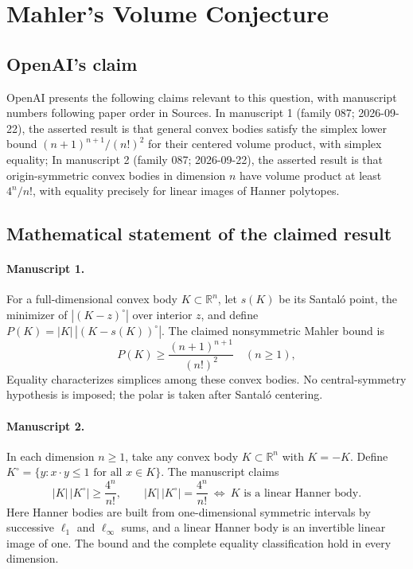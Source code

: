 \documentclass[11pt]{article}
\begin{document}
\section*{Mahler’s Volume Conjecture}

\subsection{OpenAI's claim}
OpenAI presents the following claims relevant to this question, with manuscript numbers following paper order in Sources. In manuscript 1 (family 087; 2026-09-22), the asserted result is that general convex bodies satisfy the simplex lower bound $(n+1)^{n+1}/(n!)^2$ for their centered volume product, with simplex equality; In manuscript 2 (family 087; 2026-09-22), the asserted result is that origin-symmetric convex bodies in dimension $n$ have volume product at least $4^n/n!$, with equality precisely for linear images of Hanner polytopes.

\subsection{Mathematical statement of the claimed result}
\paragraph{Manuscript 1.}
For a full-dimensional convex body $K\subset\mathbb R^n$, let $s(K)$ be its Santal\'o point, the minimizer of $|(K-z)^{\circ}|$ over interior $z$, and define $P(K)=|K|\,|(K-s(K))^{\circ}|$. The claimed nonsymmetric Mahler bound is
\[
 P(K)\ge\frac{(n+1)^{n+1}}{(n!)^2}\quad(n\ge1),
\]
Equality characterizes simplices among these convex bodies. No central-symmetry hypothesis is imposed; the polar is taken after Santal\'o centering.

\paragraph{Manuscript 2.}
In each dimension $n\ge1$, take any convex body $K\subset\mathbb R^n$ with $K=-K$. Define $K^{\circ}=\{y:x\cdot y\le1\text{ for all }x\in K\}$. The manuscript claims
\[
 |K|\,|K^{\circ}|\ge\frac{4^n}{n!},\qquad
 |K|\,|K^{\circ}|=\frac{4^n}{n!}\ \Longleftrightarrow\
 K\text{ is a linear Hanner body}.
\]
Here Hanner bodies are built from one-dimensional symmetric intervals by successive $\ell_1$ and $\ell_{\infty}$ sums, and a linear Hanner body is an invertible linear image of one. The bound and the complete equality classification hold in every dimension.
\end{document}
